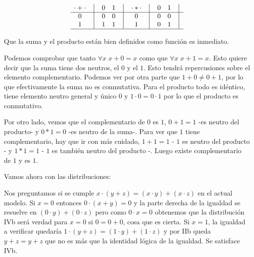 \documentclass[12pt,a4paper]{article}
\begin{document}
\begin{equation}
    \begin{matrix}
        {\cdot + \cdot} & \big{\vert} & {0} & {1} & \big{\vert} \\
        \hline
        {0}             & \big{\vert} & {0} & {0} & \big{\vert} \\
        {1}             & \big{\vert} & {1} & {1} & \big{\vert} \\
        \hline
    \end{matrix}
    \quad
    \begin{matrix}
        {\cdot * \cdot} & \big{\vert} & {0} & {1} & \big{\vert} \\
        \hline
        {0}                   & \big{\vert} & {0} & {0} & \big{\vert} \\
        {1}                   & \big{\vert} & {0} & {1} & \big{\vert} \\
        \hline
    \end{matrix}
\end{equation}



	Que la suma y el producto están bien definidos como función es inmediato.



	Podemos comprobar que tanto \(\forall x \; x + 0 = x\) como que \(\forall
x \; x + 1 = x\). Esto quiere decir que la suma tiene dos neutros, el \(0\) y
el \(1\). Esto tendrá repercusiones sobre el elemento complementario. Podemos
ver por otra parte que \(1 + 0 \neq 0 + 1\), por lo que efectivamente la suma
no es conmutativa. Para el producto todo es idéntico, tiene elemento neutro
general y único \(0\) y \(1\cdot 0 = 0\cdot 1\) por lo que el producto es
conmutativo.



	Por otro lado, vemos que el complementario de \(0\) es \(1\), \(0 + 1 =
1\) -es neutro del producto- y \(0 * 1 = 0\) -es neutro de la suma-. Para ver
que \(1\) tiene complementario, hay que ir con más cuidado, \(1 + 1 = 1\) -
\(1\) es neutro del producto - y \(1 * 1 = 1\) - \(1\) es también neutro del
producto -. Luego existe complementario de \(1\) y es \(1\).



	Vamos ahora con las distribuciones:



	Nos preguntamos si se cumple \( x \cdot ( y + z ) = ( x \cdot y ) + ( x
\cdot z ) \) en el actual modelo. Si \(x = 0\) entonces \( 0 \cdot (x + y) =
0 \) y la parte derecha de la igualdad se resuelve en \( ( 0 \cdot y ) + ( 0
\cdot z ) \) pero como \( 0 \cdot x = 0 \) obtenemos que la distribución
IVb será verdad para \(x = 0\) si \( 0 = 0 + 0 \), cosa que es
cierta. Si \( x = 1 \), la igualdad a verificar quedaría \( 1 \cdot ( y + z )
= ( 1 \cdot y ) + ( 1 \cdot z ) \) y por IIb queda \( y + z  =  y
+ z \) que no es más que la identidad lógica de la igualdad. Se satisface
IVb.
\end{document}
